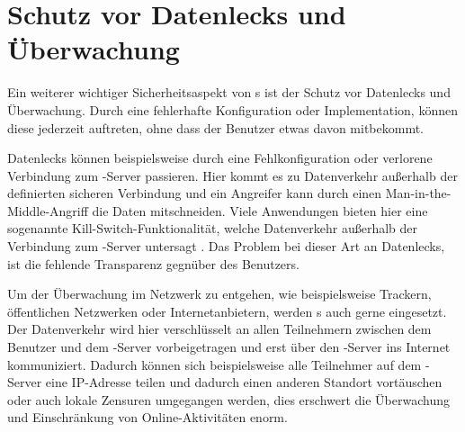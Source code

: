 \section{Schutz vor Datenlecks und Überwachung}

Ein weiterer wichtiger Sicherheitsaspekt von s ist der Schutz vor Datenlecks und Überwachung. Durch eine fehlerhafte Konfiguration oder Implementation, können diese jederzeit auftreten, ohne dass der Benutzer etwas davon mitbekommt.

Datenlecks können beispielsweise durch eine Fehlkonfiguration oder verlorene Verbindung zum -Server passieren. Hier kommt es zu Datenverkehr außerhalb der definierten sicheren Verbindung und ein Angreifer kann durch einen Man-in-the-Middle-Angriff die Daten mitschneiden. Viele Anwendungen bieten hier eine sogenannte Kill-Switch-Funktionalität, welche Datenverkehr außerhalb der Verbindung zum -Server untersagt \cite{OpenVPN_KillSwitch, NordVPN_KillSwitch}. Das Problem bei dieser Art an Datenlecks, ist die fehlende Transparenz gegnüber des Benutzers. 

Um der Überwachung im Netzwerk zu entgehen, wie beispielsweise Trackern, öffentlichen Netzwerken oder Internetanbietern, werden s auch gerne eingesetzt. Der Datenverkehr wird hier verschlüsselt an allen Teilnehmern zwischen dem Benutzer und dem -Server vorbeigetragen und erst über den -Server ins Internet kommuniziert. Dadurch können sich beispielsweise alle Teilnehmer auf dem -Server eine IP-Adresse teilen und dadurch einen anderen Standort vortäuschen oder auch lokale Zensuren umgegangen werden, dies erschwert die Überwachung und Einschränkung von Online-Aktivitäten enorm.
